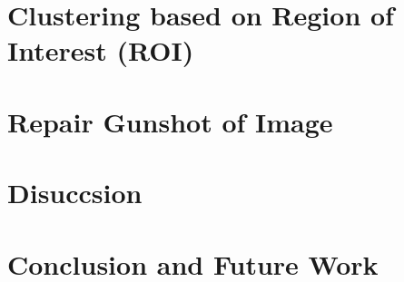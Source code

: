 \documentclass{article}
\begin{document}
\hypertarget{clustering-based-on-region-of-interest-roi}{%
\section{Clustering based on Region of Interest
(ROI)}\label{clustering-based-on-region-of-interest-roi}}

\hypertarget{repair-gunshot-of-image}{%
\section{Repair Gunshot of Image}\label{repair-gunshot-of-image}}

\hypertarget{disuccsion}{%
\section{Disuccsion}\label{disuccsion}}

\hypertarget{conclusion-and-future-work}{%
\section*{Conclusion and Future Work}\label{conclusion-and-future-work}}
\end{document}
